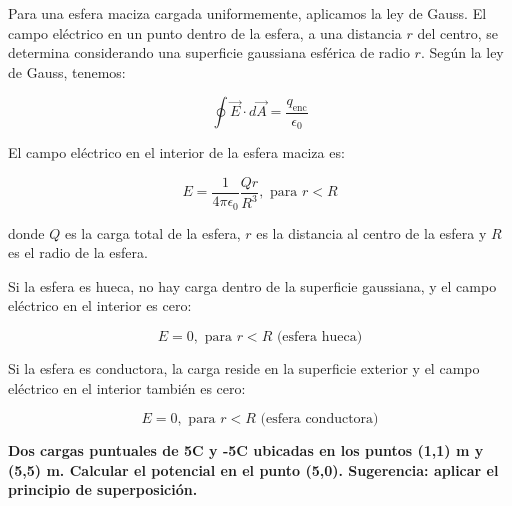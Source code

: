 \documentclass[12pt, answers]{exam} %
\begin{document}
\begin{questions}
    
        Para una esfera maciza cargada uniformemente, aplicamos la ley de Gauss. El campo eléctrico en un punto dentro de la esfera, a una distancia \( r \) del centro, se determina considerando una superficie gaussiana esférica de radio \( r \). Según la ley de Gauss, tenemos:
        
        \[
        \oint \vec{E} \cdot d\vec{A} = \frac{q_{\text{enc}}}{\epsilon_0}
        \]
        
        El campo eléctrico en el interior de la esfera maciza es:
        
        \[
        E = \frac{1}{4 \pi \epsilon_0} \frac{Q r}{R^3}, \text{ para } r < R
        \]
        
        donde \( Q \) es la carga total de la esfera, \( r \) es la distancia al centro de la esfera y \( R \) es el radio de la esfera.
        
        Si la esfera es hueca, no hay carga dentro de la superficie gaussiana, y el campo eléctrico en el interior es cero:
        
        \[
        E = 0, \text{ para } r < R \text{ (esfera hueca)}
        \]
        
        Si la esfera es conductora, la carga reside en la superficie exterior y el campo eléctrico en el interior también es cero:
        
        \[
        E = 0, \text{ para } r < R \text{ (esfera conductora)}
        \]
        
        
     \begin{center}
     \end{center}
        

    \question \large\textbf{Dos cargas puntuales de 5C y -5C ubicadas en los puntos (1,1) m y (5,5) m. Calcular el potencial en el punto (5,0). Sugerencia: aplicar el principio de superposición.}


\end{questions}
\end{document}

